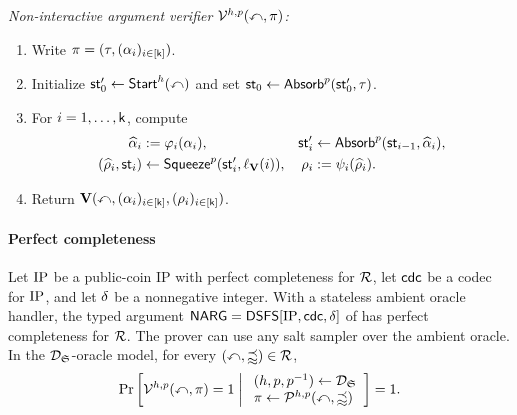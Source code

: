 \begin{construction}
\emph{Non-interactive argument verifier \(\mathcal{V}^{h,p}(\mathbb{x},\pi)\):}
\begin{enumerate}
\item Write \(\pi=(\tau,(\alpha_i)_{i\in[\mathsf{k}]})\).
\item Initialize \(\mathsf{st}'_0\leftarrow\mathsf{Start}^h(\mathbb{x})\) and set
  \(\mathsf{st}_0\leftarrow\mathsf{Absorb}^p(\mathsf{st}'_0,\tau)\).
\item For \(i=1,\ldots,\mathsf{k}\), compute
  \begin{equation*}
  \begin{aligned}
    \widehat{\alpha}_i&:=\varphi_i(\alpha_i),&
    \mathsf{st}'_i&\leftarrow\mathsf{Absorb}^p(\mathsf{st}_{i-1},\widehat{\alpha}_i),\\
    (\widehat{\rho}_i,\mathsf{st}_i)&\leftarrow\mathsf{Squeeze}^p(\mathsf{st}'_i,\ell_{\mathbf{V}}(i)),&
    \rho_i&:=\psi_i(\widehat{\rho}_i).
  \end{aligned}
  \end{equation*}
\item Return \(\mathbf{V}(\mathbb{x},
  (\alpha_i)_{i\in[\mathsf{k}]},
  (\rho_i)_{i\in[\mathsf{k}]})\).
\end{enumerate}
\end{construction}

\paragraph{Perfect completeness}

\begin{theorem}
\label{thm:dsfs_perfect_completeness}
\leanok
{}
Let \(\mathrm{IP}\) be a public-coin IP with perfect completeness for \(\mathcal{R}\), let
\(\mathsf{cdc}\) be a codec for \(\mathrm{IP}\), and let \(\delta\) be a nonnegative integer.
With a stateless ambient oracle handler, the typed argument
\(\mathsf{NARG}=\mathsf{DSFS}[\mathrm{IP},\mathsf{cdc},\delta]\) of  has perfect
completeness for \(\mathcal{R}\). The prover can use any salt sampler over the ambient oracle.
In the \(\mathcal{D}_{\mathfrak S}\)-oracle model, for every \((\mathbb{x},\mathbb{w})\in\mathcal{R}\),
\begin{equation*}
  \Pr\left[
    \mathcal{V}^{h,p}(\mathbb{x},\pi)=1
    \;\middle|\;
    \begin{array}{l}
      (h,p,p^{-1})\leftarrow\mathcal{D}_{\mathfrak S}\\
      \pi\leftarrow\mathcal{P}^{h,p}(\mathbb{x},\mathbb{w})
    \end{array}
  \right]=1.
\end{equation*}
\end{theorem}

